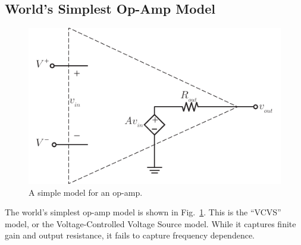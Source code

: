 \subsection{World's Simplest Op-Amp Model}
\begin{figure}[tb]
\centering
\includegraphics[scale=1]{opamp_model}
\caption{A simple model for an op-amp.}
\label{fig:opamp_model}
\end{figure}
The world's simplest op-amp model is shown in Fig.~\ref{fig:opamp_model}. This is the ``VCVS'' model, or the Voltage-Controlled Voltage Source model.  While it captures finite gain and output resistance, it fails to capture frequency dependence.
